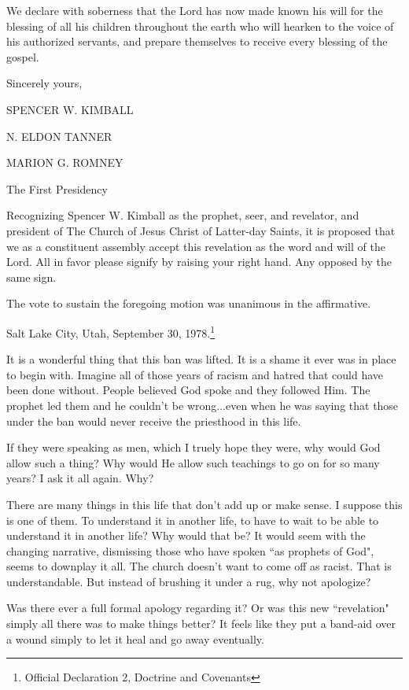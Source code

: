 \documentclass{article}
\begin{document}
\begin{displayquote}
We declare with soberness that the Lord has now made known his will for the 
blessing of all his children throughout the earth who will hearken to the 
voice of his authorized servants, and prepare themselves to receive every 
blessing of the gospel.

Sincerely yours,

SPENCER W. KIMBALL

N. ELDON TANNER

MARION G. ROMNEY

The First Presidency

Recognizing Spencer W. Kimball as the prophet, seer, and revelator, and 
president of The Church of Jesus Christ of Latter-day Saints, it is proposed 
that we as a constituent assembly accept this revelation as the word and 
will of the Lord. All in favor please signify by raising your right hand. 
Any opposed by the same sign.

The vote to sustain the foregoing motion was unanimous in the affirmative.

Salt Lake City, Utah, September 30, 1978.\footnote{Official Declaration 2, 
Doctrine and Covenants}
\end{displayquote}

It is a wonderful thing that this ban was lifted. It is a shame it ever was in
place to begin with. Imagine all of those years of racism and hatred that could
have been done without. People believed God spoke and they followed Him. The
prophet led them and he couldn't be wrong...even when he was saying that those
under the ban would never receive the priesthood in this life.

If they were speaking as men, which I truely hope they were, why would God allow
such a thing? Why would He allow such teachings to go on for so many years? I 
ask it all again. Why?

There are many things in this life that don't add up or make sense. I suppose
this is one of them. To understand it in another life, to have to wait to be 
able to understand it in another life? Why would that be? It would seem with
the changing narrative, dismissing those who have spoken ``as prophets of God",
seems to downplay it all. The church doesn't want to come off as racist. That
is understandable. But instead of brushing it under a rug, why not apologize?

Was there ever a full formal apology regarding it? Or was this new ``revelation"
simply all there was to make things better? It feels like they put a band-aid
over a wound simply to let it heal and go away eventually.
\end{document}
